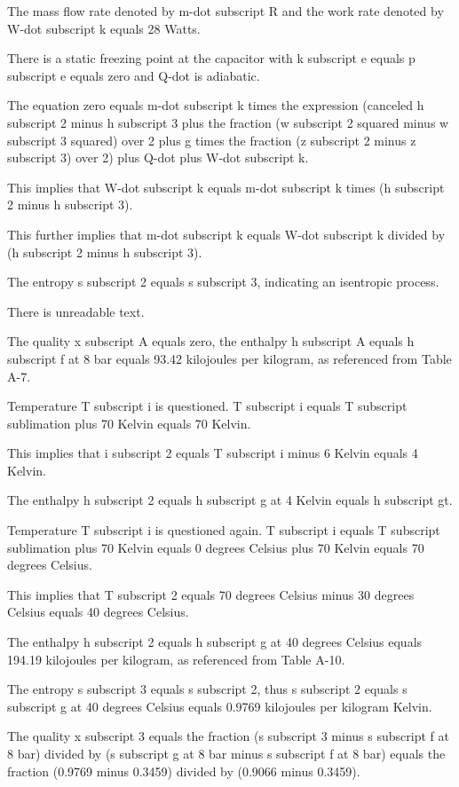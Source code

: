The mass flow rate denoted by m-dot subscript R and the work rate denoted by W-dot subscript k equals 28 Watts.

There is a static freezing point at the capacitor with k subscript e equals p subscript e equals zero and Q-dot is adiabatic.

The equation zero equals m-dot subscript k times the expression (canceled h subscript 2 minus h subscript 3 plus the fraction (w subscript 2 squared minus w subscript 3 squared) over 2 plus g times the fraction (z subscript 2 minus z subscript 3) over 2) plus Q-dot plus W-dot subscript k.

This implies that W-dot subscript k equals m-dot subscript k times (h subscript 2 minus h subscript 3).

This further implies that m-dot subscript k equals W-dot subscript k divided by (h subscript 2 minus h subscript 3).

The entropy s subscript 2 equals s subscript 3, indicating an isentropic process.

There is unreadable text.

The quality x subscript A equals zero, the enthalpy h subscript A equals h subscript f at 8 bar equals 93.42 kilojoules per kilogram, as referenced from Table A-7.

Temperature T subscript i is questioned. T subscript i equals T subscript sublimation plus 70 Kelvin equals 70 Kelvin.

This implies that i subscript 2 equals T subscript i minus 6 Kelvin equals 4 Kelvin.

The enthalpy h subscript 2 equals h subscript g at 4 Kelvin equals h subscript gt.

Temperature T subscript i is questioned again. T subscript i equals T subscript sublimation plus 70 Kelvin equals 0 degrees Celsius plus 70 Kelvin equals 70 degrees Celsius.

This implies that T subscript 2 equals 70 degrees Celsius minus 30 degrees Celsius equals 40 degrees Celsius.

The enthalpy h subscript 2 equals h subscript g at 40 degrees Celsius equals 194.19 kilojoules per kilogram, as referenced from Table A-10.

The entropy s subscript 3 equals s subscript 2, thus s subscript 2 equals s subscript g at 40 degrees Celsius equals 0.9769 kilojoules per kilogram Kelvin.

The quality x subscript 3 equals the fraction (s subscript 3 minus s subscript f at 8 bar) divided by (s subscript g at 8 bar minus s subscript f at 8 bar) equals the fraction (0.9769 minus 0.3459) divided by (0.9066 minus 0.3459).